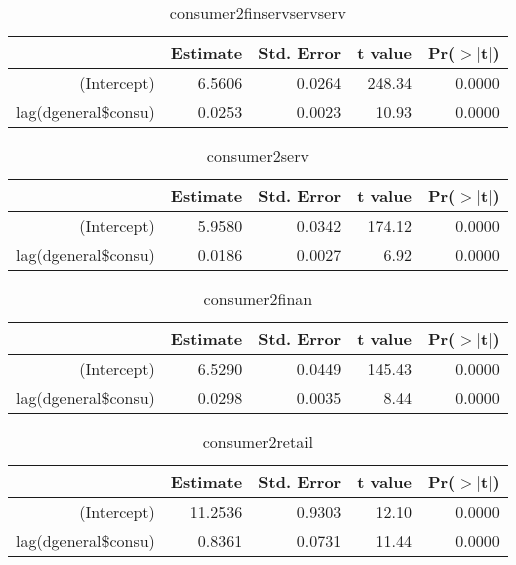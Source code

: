 \documentclass[12pt,a4paper]{report}
\begin{document}
	\begin{table}[ht]
		\centering
		\begin{tabular}{rrrrr}
			\hline
			& Estimate & Std. Error & t value & Pr($>$$|$t$|$) \\ 
			\hline
			(Intercept) & 6.5606 & 0.0264 & 248.34 & 0.0000 \\ 
			lag(dgeneral\$consu) & 0.0253 & 0.0023 & 10.93 & 0.0000 \\ 
			\hline
		\end{tabular}
		\caption{consumer2finservservserv} 
	\end{table}
	
	\begin{table}[ht]
		\centering
		\begin{tabular}{rrrrr}
			\hline
			& Estimate & Std. Error & t value & Pr($>$$|$t$|$) \\ 
			\hline
			(Intercept) & 5.9580 & 0.0342 & 174.12 & 0.0000 \\ 
			lag(dgeneral\$consu) & 0.0186 & 0.0027 & 6.92 & 0.0000 \\ 
			\hline
		\end{tabular}
		\caption{consumer2serv} 
	\end{table}
	
	\begin{table}[ht]
		\centering
		\begin{tabular}{rrrrr}
			\hline
			& Estimate & Std. Error & t value & Pr($>$$|$t$|$) \\ 
			\hline
			(Intercept) & 6.5290 & 0.0449 & 145.43 & 0.0000 \\ 
			lag(dgeneral\$consu) & 0.0298 & 0.0035 & 8.44 & 0.0000 \\ 
			\hline
		\end{tabular}
		\caption{consumer2finan} 
	\end{table}
	
	\begin{table}[ht]
		\centering
		\begin{tabular}{rrrrr}
			\hline
			& Estimate & Std. Error & t value & Pr($>$$|$t$|$) \\ 
			\hline
			(Intercept) & 11.2536 & 0.9303 & 12.10 & 0.0000 \\ 
			lag(dgeneral\$consu) & 0.8361 & 0.0731 & 11.44 & 0.0000 \\ 
			\hline
		\end{tabular}
		\caption{consumer2retail} 
	\end{table}
\end{document}
